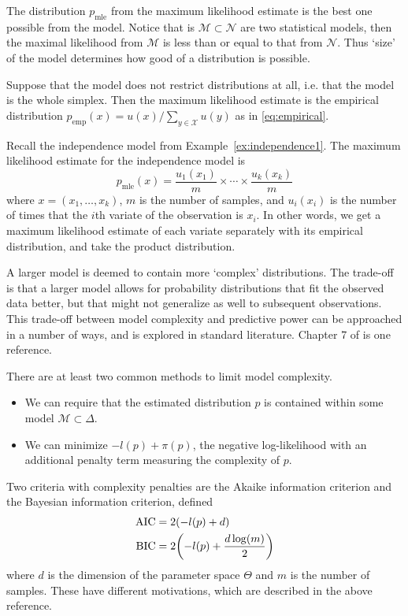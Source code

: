 \documentclass[cclicense]{hmcthesis}
\providecommand*{\xs}{\mathcal X}
\providecommand*{\ms}{\mathcal M}
\providecommand*{\ns}{\mathcal N}
\newcommand*{\mle}{\mathrm{mle}}
\newcommand*{\emp}{\mathrm{emp}}
\numberwithin{equation}{chapter}
\numberwithin{thmcounter}{chapter}
\begin{document}
    The distribution $p_\mle$ from the maximum likelihood estimate is the best
    one possible from the model.  Notice that is $\ms \subset \ns$ are two
    statistical models, then the maximal likelihood from $\ms$ is less than or
    equal to that from $\ns$.  Thus `size' of the model determines how good of a
    distribution is possible.
    \begin{example}
        Suppose that the model does not restrict distributions at all, i.e.
        that the model is the whole simplex.  Then the maximum likelihood
        estimate is the empirical distribution $p_\emp(x) = u(x) / \sum_{y \in
        \xs} u(y)$ as in \eqref{eq:empirical}.
    \end{example}
    \begin{example}[Independence]
        Recall the independence model from Example~\ref{ex:independence1}.  The
        maximum likelihood estimate for the independence model is
        \[
            p_\mle(x) = \frac{u_1(x_1)}{m} \times \cdots \times \frac{u_k(x_k)}{m}
        \]
        where $x = (x_1, \ldots, x_k)$, $m$ is the number of samples, and
        $u_i(x_i)$ is the number of times that the $i$th variate of the
        observation is $x_i$.  In other words, we get a maximum likelihood
        estimate of each variate separately with its empirical distribution, and
        take the product distribution.
    \end{example}

    A larger model is deemed to contain more `complex' distributions.  The
    trade-off is that a larger model allows for probability distributions that
    fit the observed data better, but that might not generalize as well to
    subsequent observations.  This trade-off between model complexity and
    predictive power can be approached in a number of ways, and is explored in
    standard literature.  Chapter 7 of \citep{EOSL} is one reference.  
    
    There are at least two common methods to limit model complexity.
    \begin{itemize}
    \item We can require that the estimated distribution $p$ is contained within
    some model $\ms \subset \Delta$.
    \item We can minimize $-l(p) + \pi(p)$, the negative log-likelihood with an
    additional penalty term measuring the complexity of $p$.
    \end{itemize}
    Two criteria with complexity penalties are the Akaike information criterion
    and the Bayesian information criterion, defined
    \begin{align*}
        \mathrm{AIC} &= 2\pdel*{-l(p) + d} \\
        \mathrm{BIC} &= 2\pdel*{-l(p) + \frac{d \log(m)}{2}}
    \end{align*}
    where $d$ is the dimension of the parameter space $\Theta$ and $m$ is the
    number of samples.  These have different motivations, which are described in
    the above reference.
\end{document}
